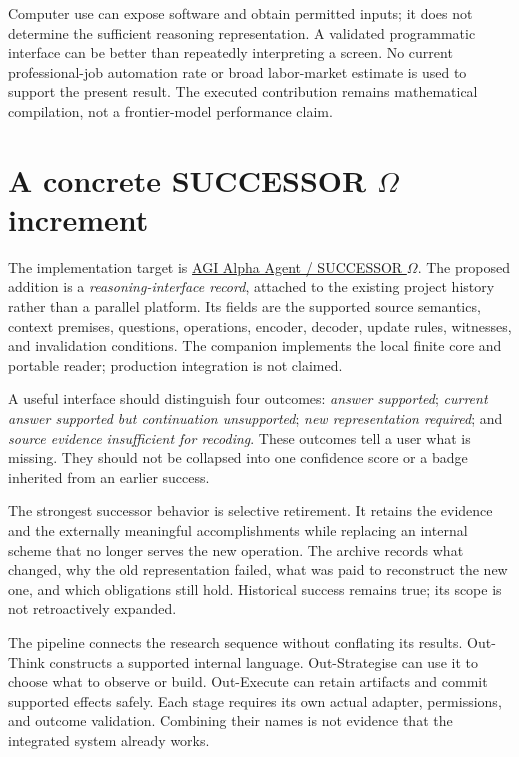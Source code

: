 \documentclass[11pt,letterpaper]{article}
\theoremstyle{remark}\newtheorem{remark}{Remark}[section]
\begin{document}
Computer use can expose software and obtain permitted inputs; it does not determine the sufficient reasoning representation. A validated programmatic interface can be better than repeatedly interpreting a screen. No current professional-job automation rate or broad labor-market estimate is used to support the present result. The executed contribution remains mathematical compilation, not a frontier-model performance claim.

\section{A concrete SUCCESSOR \texorpdfstring{$\Omega$}{Omega} increment}
\label{sec:successor}
The implementation target is \href{https://github.com/MontrealAI/AGI-Alpha-Agent-v0}{AGI Alpha Agent / SUCCESSOR $\Omega$}. The proposed addition is a \emph{reasoning-interface record}, attached to the existing project history rather than a parallel platform. Its fields are the supported source semantics, context premises, questions, operations, encoder, decoder, update rules, witnesses, and invalidation conditions. The companion implements the local finite core and portable reader; production integration is not claimed.

A useful interface should distinguish four outcomes: \emph{answer supported}; \emph{current answer supported but continuation unsupported}; \emph{new representation required}; and \emph{source evidence insufficient for recoding}. These outcomes tell a user what is missing. They should not be collapsed into one confidence score or a badge inherited from an earlier success.

The strongest successor behavior is selective retirement. It retains the evidence and the externally meaningful accomplishments while replacing an internal scheme that no longer serves the new operation. The archive records what changed, why the old representation failed, what was paid to reconstruct the new one, and which obligations still hold. Historical success remains true; its scope is not retroactively expanded.

The pipeline connects the research sequence without conflating its results. Out-Think constructs a supported internal language. Out-Strategise can use it to choose what to observe or build. Out-Execute can retain artifacts and commit supported effects safely. Each stage requires its own actual adapter, permissions, and outcome validation. Combining their names is not evidence that the integrated system already works.
\end{document}
